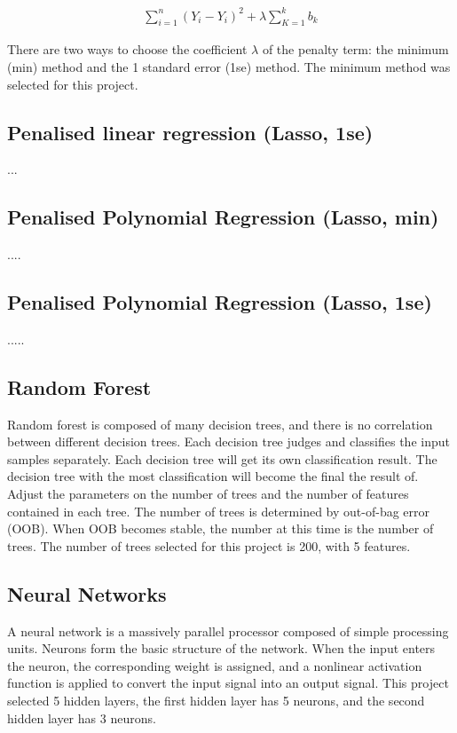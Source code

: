 \begin{eqnarray}
    \sum_{i=1}^{n}{(Y_i-Y_i)^2} + \lambda  \sum_{K=1}^{k}{b_k}
\end{eqnarray}

There are two ways to choose the coefficient $\lambda$ of the penalty term: the minimum (min) method and the 1 standard error (1se) method. The minimum method was selected for this project.

\subsection{Penalised linear regression (Lasso, 1se)}
...

\subsection{Penalised Polynomial Regression (Lasso, min)}
....

\subsection{Penalised Polynomial Regression (Lasso, 1se)}
.....

\subsection{Random Forest}
Random forest is composed of many decision trees, and there is no correlation between different decision trees. Each decision tree judges and classifies the input samples separately. Each decision tree will get its own classification result. The decision tree with the most classification will become the final the result of. Adjust the parameters on the number of trees and the number of features contained in each tree. The number of trees is determined by out-of-bag error (OOB). When OOB becomes stable, the number at this time is the number of trees. The number of trees selected for this project is 200, with 5 features.

\subsection{Neural Networks}
A neural network is a massively parallel processor composed of simple processing units. Neurons form the basic structure of the network. When the input enters the neuron, the corresponding weight is assigned, and a nonlinear activation function is applied to convert the input signal into an output signal. This project selected 5 hidden layers, the first hidden layer has 5 neurons, and the second hidden layer has 3 neurons.
